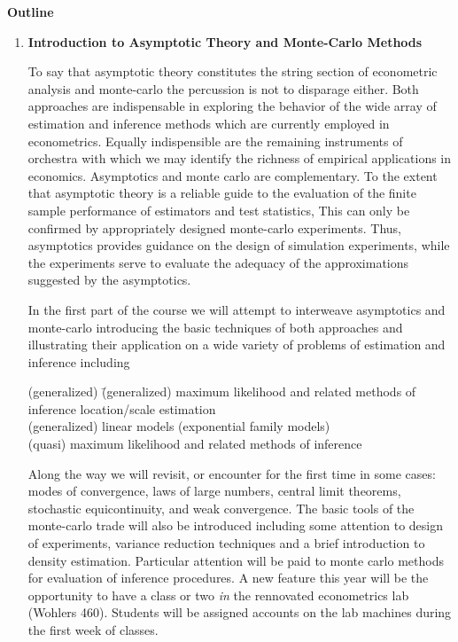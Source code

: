 \documentclass[12pt]{article}
\begin{document}
\vspace{10mm}
\begin{center}
{\bf Outline}
\end{center}

\begin{enumerate}
\item {\bf Introduction to Asymptotic Theory and Monte-Carlo Methods}

To say that asymptotic theory constitutes the string section
of econometric analysis and 
monte-carlo  the percussion is not to disparage either.  Both approaches are 
indispensable in exploring the behavior of the 
wide array of estimation and inference methods which are currently 
employed in econometrics.  
Equally indispensible are the remaining instruments of orchestra with
which we may identify the richness of empirical applications in economics.
Asymptotics and monte carlo are complementary.  To the 
extent that asymptotic theory is a reliable guide to the evaluation of the 
finite sample performance of estimators and test statistics,  This can 
only be confirmed by appropriately designed monte-carlo experiments.  Thus,
asymptotics provides guidance on the design of simulation experiments, 
while the experiments serve to evaluate the adequacy of the approximations 
suggested by the asymptotics.


In the first part of the course we will attempt to interweave 
asymptotics and monte-carlo introducing the basic techniques of both 
approaches and illustrating their application on a wide variety of problems
of estimation and inference including

\begin{tabbing}
(generalized) \= (generalized) maximum likelihood and related methods of inference \kill
 \> location/scale estimation \\
 \> (generalized) linear models (exponential family models) \\
 \> (quasi) maximum likelihood and related methods of inference
\end{tabbing}

\noindent
Along the way we will revisit, or encounter for the first time in some 
cases:  modes of convergence, laws of large numbers, central 
limit theorems, stochastic equicontinuity, and weak convergence.  The basic
tools of the monte-carlo trade will also be introduced including some attention
to design of experiments, variance reduction techniques and a brief
introduction to density estimation.  Particular attention will be paid to
monte carlo methods for evaluation of inference procedures.  
A new feature this year will be the opportunity to have a class or two
{\it in} the rennovated econometrics lab (Wohlers 460).  Students will
be assigned accounts on the lab machines during the first week of classes. 


\end{enumerate}
\end{document}
